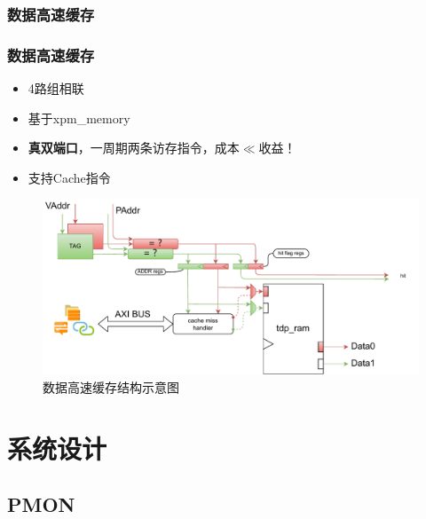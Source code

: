 \documentclass{beamer}
\begin{document}
\subsubsection{数据高速缓存}

\begin{frame}
    \frametitle{数据高速缓存}

    \begin{itemize}
        \item 4路组相联
        \item 基于xpm\_memory
        \item \textbf{真双端口}，一周期两条访存指令，成本$\ll$收益！ 
        \item 支持Cache指令
    \end{itemize}

    \begin{figure}
        \centering
        \includegraphics[width=.7\linewidth]{pic/dcache.pdf}
        \caption{数据高速缓存结构示意图}
    \end{figure}

\end{frame}

\section{系统设计}

\subsection{PMON}
\end{document}
